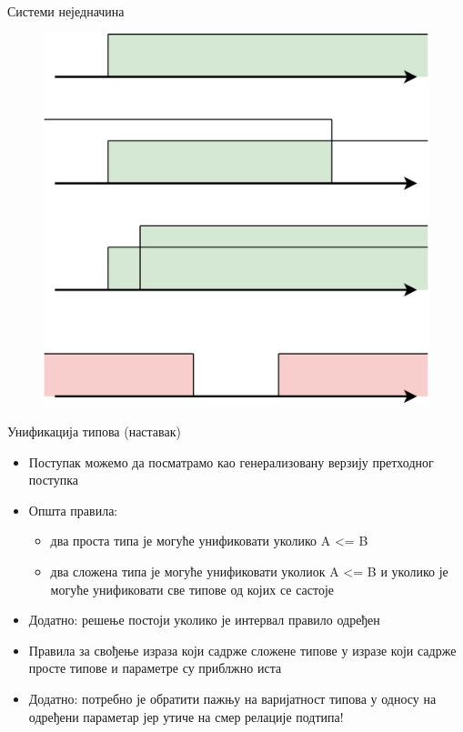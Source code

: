 \documentclass[xcolor=table]{beamer}
\begin{document}
    \begin{frame}{Системи неједначина}
        \begin{figure}
            \centering
            \includegraphics[width=\textwidth,height=0.8\textheight,keepaspectratio]{images/nejed_int.png}
        \end{figure}
    \end{frame}

    \begin{frame}[allowframebreaks]{Унификација типова (наставак)}
        \begin{itemize}
            \item Поступак можемо да посматрамо као генерализовану верзију претходног поступка
            \item Општа правила:
            \begin{itemize}
                \item два проста типа је могуће унификовати уколико A <= B
                \item два сложена типа је могуће унификовати уколиок A <= B и уколико је могуће унификовати све типове од којих се састоје
            \end{itemize}
            \item Додатно: решење постоји уколико је интервал правило одређен
            \item Правила за свођење израза који садрже сложене типове у изразе који садрже просте типове и параметре су приблжно иста
            \item Додатно: потребно је обратити пажњу на варијатност типова у односу на одређени параметар јер утиче на смер релације подтипа!
        \end{itemize}
    \end{frame}
\end{document}
